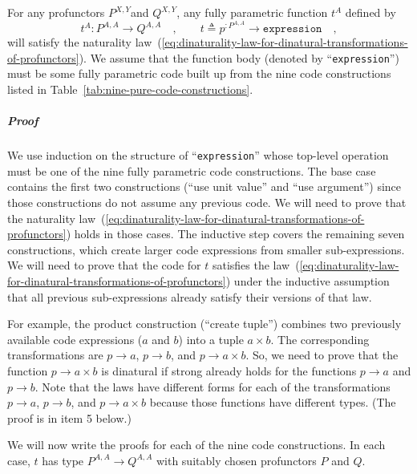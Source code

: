 For any profunctors $P^{X,Y}$and $Q^{X,Y}$, any fully parametric
function $t^{A}$ defined by 
\[
t^{A}:P^{A,A}\rightarrow Q^{A,A}\quad,\quad\quad t\triangleq p^{:P^{A,A}}\rightarrow{\scriptstyle \mathtt{expression}}\quad,
\]
will satisfy the naturality law~(\ref{eq:dinaturality-law-for-dinatural-transformations-of-profunctors}).
We assume that the function body (denoted by \textsf{``}\lstinline!expression!\textsf{''})
must be some fully parametric code built up from the nine code constructions
listed in Table~\ref{tab:nine-pure-code-constructions}.

\subparagraph{Proof }

We use induction on the structure of \textsf{``}\lstinline!expression!\textsf{''}
whose top-level operation must be one of the nine fully parametric
code constructions. The base case contains the first two constructions
(\textsf{``}use unit value\textsf{''} and \textsf{``}use argument\textsf{''}) since those constructions
do not assume any previous code. We will need to prove that the naturality
law~(\ref{eq:dinaturality-law-for-dinatural-transformations-of-profunctors})
holds in those cases. The inductive step covers the remaining seven
constructions, which create larger code expressions from smaller sub-expressions.
We will need to prove that the code for $t$ satisfies the law~(\ref{eq:dinaturality-law-for-dinatural-transformations-of-profunctors})
under the inductive assumption that all previous sub-expressions already
satisfy their versions of that law.

For example, the product construction (\textsf{``}create tuple\textsf{''}) combines
two previously available code expressions ($a$ and $b$) into a tuple
$a\times b$. The corresponding transformations are $p\rightarrow a$,
$p\rightarrow b$, and $p\rightarrow a\times b$. So, we need to prove
that the function $p\rightarrow a\times b$ is dinatural if strong
already holds for the functions $p\rightarrow a$ and $p\rightarrow b$.
Note that the laws have different forms for each of the transformations
$p\rightarrow a$, $p\rightarrow b$, and $p\rightarrow a\times b$
because those functions have different types. (The proof is in item
5 below.)

We will now write the proofs for each of the nine code constructions.
In each case, $t$ has type $P^{A,A}\rightarrow Q^{A,A}$ with suitably
chosen profunctors $P$ and $Q$. %
\begin{comment}
In some cases, we will prove strong dinaturality (from which dinaturality
follows).
\end{comment}


